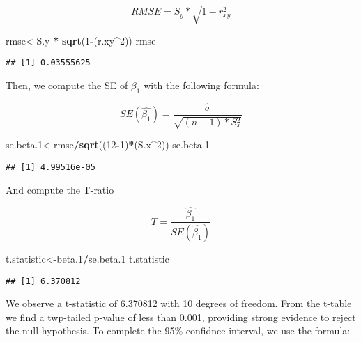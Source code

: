 \documentclass[]{article}
\newenvironment{Shaded}{\begin{snugshade}}{\end{snugshade}}
\newcommand{\KeywordTok}[1]{\textcolor[rgb]{0.13,0.29,0.53}{\textbf{#1}}}
\newcommand{\DecValTok}[1]{\textcolor[rgb]{0.00,0.00,0.81}{#1}}
\newcommand{\StringTok}[1]{\textcolor[rgb]{0.31,0.60,0.02}{#1}}
\newcommand{\OperatorTok}[1]{\textcolor[rgb]{0.81,0.36,0.00}{\textbf{#1}}}
\newcommand{\NormalTok}[1]{#1}
\begin{document}
\[
RMSE = S_y * \sqrt{1-r{_{xy}^2}}
\]

\begin{Shaded}
\begin{Highlighting}[]
\NormalTok{rmse<-S.y }\OperatorTok{*}\StringTok{ }\KeywordTok{sqrt}\NormalTok{(}\DecValTok{1}\OperatorTok{-}\NormalTok{(r.xy}\OperatorTok{^}\DecValTok{2}\NormalTok{))}
\NormalTok{rmse}
\end{Highlighting}
\end{Shaded}

\begin{verbatim}
## [1] 0.03555625
\end{verbatim}

Then, we compute the SE of \(\beta_1\) with the following formula:

\[
SE(\hat{\beta_1}) = \frac{\hat{\sigma}}{\sqrt{(n-1)*S{_x^2}}}
\]

\begin{Shaded}
\begin{Highlighting}[]
\NormalTok{se.beta.}\DecValTok{1}\NormalTok{<-rmse}\OperatorTok{/}\KeywordTok{sqrt}\NormalTok{((}\DecValTok{12}\OperatorTok{-}\DecValTok{1}\NormalTok{)}\OperatorTok{*}\NormalTok{(S.x}\OperatorTok{^}\DecValTok{2}\NormalTok{))}
\NormalTok{se.beta.}\DecValTok{1}
\end{Highlighting}
\end{Shaded}

\begin{verbatim}
## [1] 4.99516e-05
\end{verbatim}

And compute the T-ratio

\[
T=\frac{\hat{\beta_1}}{SE(\hat{\beta_1})}
\]

\begin{Shaded}
\begin{Highlighting}[]
\NormalTok{t.statistic<-beta.}\DecValTok{1}\OperatorTok{/}\NormalTok{se.beta.}\DecValTok{1}
\NormalTok{t.statistic}
\end{Highlighting}
\end{Shaded}

\begin{verbatim}
## [1] 6.370812
\end{verbatim}

We observe a t-statistic of 6.370812 with 10 degrees of freedom. From
the t-table we find a twp-tailed p-value of less than 0.001, providing
strong evidence to reject the null hypothesis. To complete the 95\%
confidnce interval, we use the formula:
\end{document}

